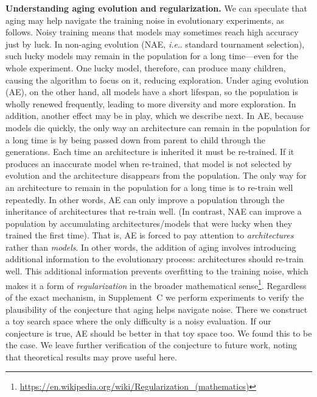 \documentclass[letterpaper]{article} \usepackage{aaai19}  \usepackage{times}  \usepackage{helvet}  \usepackage{courier}  \usepackage{graphicx}  \frenchspacing
\makeatletter
\DeclareRobustCommand\onedot{\futurelet\@let@token\@onedot}
\def\@onedot{\ifx\@let@token.\else.\null\fi\xspace}
\def\ie{\emph{i.e}\onedot}
\makeatother
\begin{document}
\textbf{Understanding aging evolution and regularization.} We can speculate that aging may help navigate the training noise in evolutionary experiments, as follows. Noisy training means that models may sometimes reach high accuracy just by luck. In non-aging evolution (NAE, \ie standard tournament selection), such lucky models may remain in the population for a long time---even for the whole experiment. One lucky model, therefore, can produce many children, causing the algorithm to focus on it, reducing exploration. Under aging evolution (AE), on the other hand, all models have a short lifespan, so the population is wholly renewed frequently, leading to more diversity and more exploration. In addition, another effect may be in play, which we describe next. In AE, because models die quickly, the only way an architecture can remain in the population for a long time is by being passed down from parent to child through the generations. Each time an architecture is inherited it must be re-trained. If it produces an inaccurate model when re-trained, that model is not selected by evolution and the architecture disappears from the population. The only way for an architecture to remain in the population for a long time is to re-train well repeatedly. In other words, AE can only improve a population through the inheritance of architectures that re-train well. (In contrast, NAE can improve a population by accumulating architectures/models that were lucky when they trained the first time). That is, AE is forced to pay attention to \textit{architectures} rather than \textit{models}. In other words, the addition of aging involves introducing additional information to the evolutionary process: architectures should re-train well. This additional information prevents overfitting to the training noise, which makes it a form of \textit{regularization} in the broader mathematical sense\footnote{\url{https://en.wikipedia.org/wiki/Regularization_(mathematics)}}. Regardless of the exact mechanism, in Supplement~C we perform experiments to verify the plausibility of the conjecture that aging helps navigate noise. There we construct a toy search space where the only difficulty is a noisy evaluation. If our conjecture is true, AE should be better in that toy space too. We found this to be the case. We leave further verification of the conjecture to future work, noting that theoretical results may prove useful here.
\end{document}
